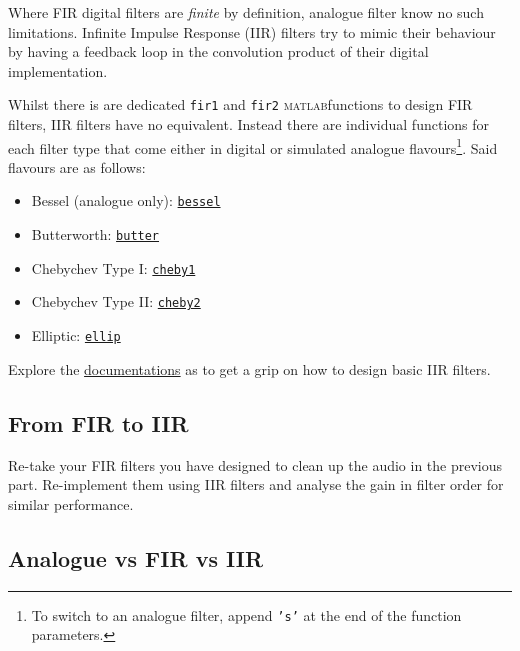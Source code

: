 \documentclass{../template/labo}
\author{DLH}
\newcommand{\matlab}{\textsc{matlab}}
\begin{document}

Where FIR digital filters are \textit{finite} by definition, analogue filter know no such limitations.
Infinite Impulse Response (IIR) filters try to mimic their behaviour by having a feedback loop in the convolution product of their digital implementation.

Whilst there is are dedicated \texttt{fir1} and \texttt{fir2} \matlab functions to design FIR filters, IIR filters have no equivalent.
Instead there are individual functions for each filter type that come either in digital or simulated analogue flavours\footnote{To switch to an analogue filter, append \texttt{'s'} at the end of the function parameters.}.
Said flavours are as follows:
\begin{itemize}
  \item Bessel (analogue only): \href{https://nl.mathworks.com/help/signal/ref/besself.html}{\texttt{bessel}}
  \item Butterworth: \href{https://nl.mathworks.com/help/signal/ref/butter.html}{\texttt{butter}}
  \item Chebychev Type I: \href{https://nl.mathworks.com/help/signal/ref/cheby1.html}{\texttt{cheby1}}
  \item Chebychev Type II: \href{https://nl.mathworks.com/help/signal/ref/cheby2.html}{\texttt{cheby2}}
  \item Elliptic: \href{https://nl.mathworks.com/help/signal/ref/ellip.html}{\texttt{ellip}}
\end{itemize}

\begin{leftbar}
Explore the \href{https://nl.mathworks.com/help/signal/ug/iir-filter-design.html}{documentations} as to get a grip on how to design basic IIR filters.
\end{leftbar}

\subsection*{From FIR to IIR}

Re-take your FIR filters you have designed to clean up the audio in the previous part.
Re-implement them using IIR filters and analyse the gain in filter order for similar performance.



\subsection*{Analogue vs FIR vs IIR}
\end{document}
